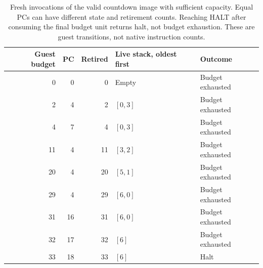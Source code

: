 \begin{table}[htbp]
  \centering
  \begin{tabular}{r r r l l}
    \toprule
    Guest budget & PC & Retired & Live stack, oldest first & Outcome          \\
    \midrule
    0            & 0  & 0       & Empty                    & Budget exhausted \\
    2            & 4  & 2       & $[0,3]$                  & Budget exhausted \\
    4            & 7  & 4       & $[0,3]$                  & Budget exhausted \\
    11           & 4  & 11      & $[3,2]$                  & Budget exhausted \\
    20           & 4  & 20      & $[5,1]$                  & Budget exhausted \\
    29           & 4  & 29      & $[6,0]$                  & Budget exhausted \\
    31           & 16 & 31      & $[6,0]$                  & Budget exhausted \\
    32           & 17 & 32      & $[6]$                    & Budget exhausted \\
    33           & 18 & 33      & $[6]$                    & Halt             \\
    \bottomrule
  \end{tabular}
  \caption{Fresh invocations of the valid countdown image with sufficient capacity. Equal PCs can have different state and retirement counts. Reaching HALT after consuming the final budget unit returns halt, not budget exhaustion. These are guest transitions, not native instruction counts.}
  \label{tab:revision-bytecode-prefixes}
\end{table}

